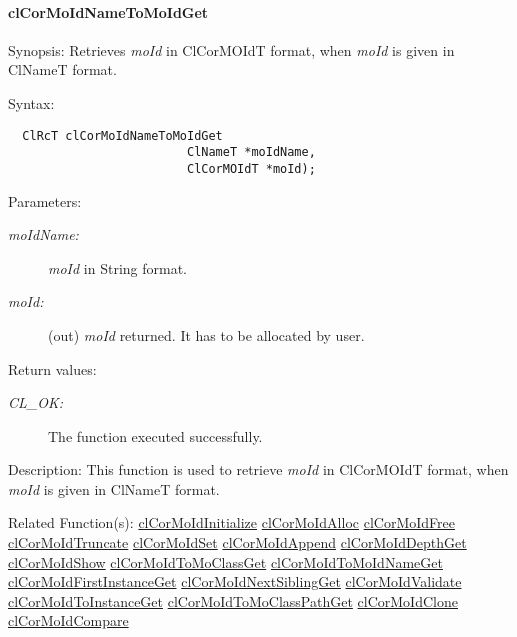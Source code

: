 \hypertarget{pagecor273}{}\paragraph{cl\-Cor\-Mo\-Id\-Name\-To\-Mo\-Id\-Get}\label{pagecor273}
\begin{Desc}
\item[Synopsis:]Retrieves {\em mo\-Id\/} in Cl\-Cor\-MOId\-T format, when {\em mo\-Id\/} is given in Cl\-Name\-T format.\end{Desc}
\begin{Desc}
\item[Syntax:]

\footnotesize\begin{verbatim}  ClRcT clCorMoIdNameToMoIdGet
                         ClNameT *moIdName, 
                         ClCorMOIdT *moId);
\end{verbatim}
\normalsize
\end{Desc}
\begin{Desc}
\item[Parameters:]
\begin{description}
\item[{\em mo\-Id\-Name:}]{\em mo\-Id\/} in String format. \item[{\em mo\-Id:}](out) {\em mo\-Id\/} returned. It has to be allocated by user.\end{description}
\end{Desc}
\begin{Desc}
\item[Return values:]
\begin{description}
\item[{\em CL\_\-OK:}]The function executed successfully.\end{description}
\end{Desc}
\begin{Desc}
\item[Description:]This function is used to retrieve {\em mo\-Id\/} in Cl\-Cor\-MOId\-T format, when {\em mo\-Id\/} is given in Cl\-Name\-T format.\end{Desc}
\begin{Desc}
\item[Related Function(s):]\hyperlink{group__group13}{cl\-Cor\-Mo\-Id\-Initialize} \hyperlink{group__group13}{cl\-Cor\-Mo\-Id\-Alloc} \hyperlink{group__group13}{cl\-Cor\-Mo\-Id\-Free} \hyperlink{group__group13}{cl\-Cor\-Mo\-Id\-Truncate} \hyperlink{group__group13}{cl\-Cor\-Mo\-Id\-Set} \hyperlink{group__group13}{cl\-Cor\-Mo\-Id\-Append} \hyperlink{group__group13}{cl\-Cor\-Mo\-Id\-Depth\-Get} \hyperlink{group__group13}{cl\-Cor\-Mo\-Id\-Show} \hyperlink{group__group13}{cl\-Cor\-Mo\-Id\-To\-Mo\-Class\-Get} \hyperlink{group__group13}{cl\-Cor\-Mo\-Id\-To\-Mo\-Id\-Name\-Get} \hyperlink{group__group13}{cl\-Cor\-Mo\-Id\-First\-Instance\-Get} \hyperlink{group__group13}{cl\-Cor\-Mo\-Id\-Next\-Sibling\-Get} \hyperlink{group__group13}{cl\-Cor\-Mo\-Id\-Validate} \hyperlink{group__group13}{cl\-Cor\-Mo\-Id\-To\-Instance\-Get} \hyperlink{group__group13}{cl\-Cor\-Mo\-Id\-To\-Mo\-Class\-Path\-Get} \hyperlink{group__group13}{cl\-Cor\-Mo\-Id\-Clone} \hyperlink{group__group13}{cl\-Cor\-Mo\-Id\-Compare} \end{Desc}

